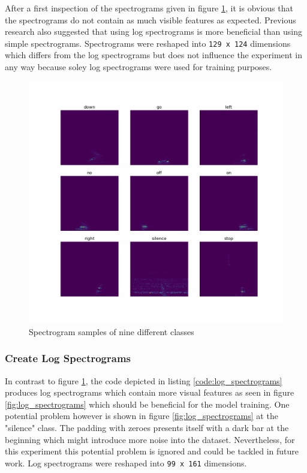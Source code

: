 \documentclass{article}
\theoremstyle{definition}
\theoremstyle{remark}
\begin{document}
After a first inspection of the spectrograms given in figure \ref{fig:spectrograms}, it is obvious that the spectrograms do not contain as much visible features as expected. Previous research \cite{gouda2018speech} also suggested that using log spectrograms is more beneficial than using simple spectrograms. Spectrograms were reshaped into \texttt{129 x 124} dimensions which differs from the log spectrograms but does not influence the experiment in any way because soley log spectrograms were used for training purposes.


\begin{figure}[h!]
    \centering
    \includegraphics[width=1\textwidth]{img/9_spectrograms.png}
    \caption{Spectrogram samples of nine different classes}
    \label{fig:spectrograms}
\end{figure}

\newpage

\subsubsection{Create Log Spectrograms}

In contrast to figure \ref{fig:spectrograms}, the code depicted in listing \ref{code:log_spectrograms} produces log spectrograms which contain more visual features as seen in figure \ref{fig:log_spectrograms} which should be beneficial for the model training. One potential problem however is shown in figure \ref{fig:log_spectrograms} at the "silence" class. The padding with zeroes presents itself with a dark bar at the beginning which might introduce more noise into the dataset. Nevertheless, for this experiment this potential problem is ignored and could be tackled in future work. Log spectrograms were reshaped into \texttt{99 x 161} dimensions.
\end{document}
